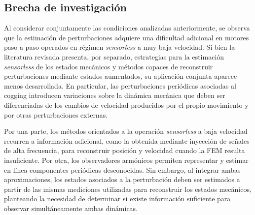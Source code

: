 \subsection{Brecha de investigación}

%
%
%
%
Al considerar conjuntamente las condiciones analizadas anteriormente, se observa que la estimación de perturbaciones adquiere una dificultad adicional en motores paso a paso operados en régimen \textit{sensorless} a muy baja velocidad. Si bien la literatura revisada presenta, por separado, estrategias para la estimación \textit{sensorless} de los estados mecánicos y métodos capaces de reconstruir perturbaciones mediante estados aumentados, su aplicación conjunta aparece menos desarrollada. En particular, las perturbaciones periódicas asociadas al cogging introducen variaciones sobre la dinámica mecánica que deben ser diferenciadas de los cambios de velocidad producidos por el propio movimiento y por otras perturbaciones externas.

%
%
%
%
%

Por una parte, los métodos orientados a la operación \textit{sensorless} a baja velocidad recurren a información adicional, como la obtenida mediante inyección de señales de alta frecuencia, para reconstruir posición y velocidad cuando la FEM resulta insuficiente. Por otra, los observadores armónicos permiten representar y estimar en línea componentes periódicas desconocidas. Sin embargo, al integrar ambas aproximaciones, los estados asociados a la perturbación deben ser estimados a partir de las mismas mediciones utilizadas para reconstruir los estados mecánicos, planteando la necesidad de determinar si existe información suficiente para observar simultáneamente ambas dinámicas.
%
%
%
%
%

